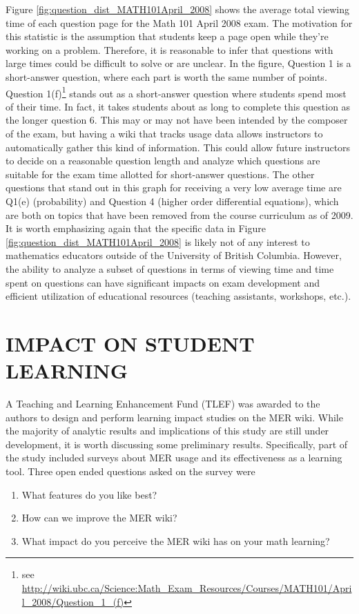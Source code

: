 \documentclass{primus}
\begin{document}
\noindent{}Figure \ref{fig:question_dist_MATH101April_2008} shows the average total viewing time of each question page for the Math 101 April 2008 exam. The motivation for this statistic is the assumption that students keep a page open while they’re working on a problem. Therefore, it is reasonable to infer that questions with large times could be difficult to solve or are unclear. In the figure, Question 1 is a short-answer question, where each part is worth the same number of points. Question 1(f)\footnote{see \url{http://wiki.ubc.ca/Science:Math_Exam_Resources/Courses/MATH101/April_2008/Question_1_(f)}} stands out as a short-answer question where students spend most of their time. In fact, it takes students about as long to complete this question as the longer question 6. This may or may not have been intended by the composer of the exam, but having a wiki that tracks usage data allows instructors to automatically gather this kind of information. This could allow future instructors to decide on a reasonable question length and analyze which questions are suitable for the exam time allotted for short-answer questions. The other questions that stand out in this graph for receiving a very low average time are Q1(e) (probability) and Question 4 (higher order differential equations), which are both on topics that have been removed from the course curriculum as of 2009.  It is worth emphasizing again that the specific data in Figure \ref{fig:question_dist_MATH101April_2008} is likely not of any interest to mathematics educators outside of the University of British Columbia.  However, the ability to analyze a subset of questions in terms of viewing time and time spent on questions can have significant impacts on exam development and efficient utilization of educational resources (teaching assistants, workshops, etc.).

\section{IMPACT ON STUDENT LEARNING}
A Teaching and Learning Enhancement Fund (TLEF) was awarded to the authors to design and perform learning impact studies on the MER wiki.  While the majority of analytic results and implications of this study are still under development, it is worth discussing some preliminary results.  Specifically, part of the study included surveys about MER usage and its effectiveness as a learning tool.  Three open ended questions asked on the survey were

\begin{enumerate}
\item What features do you like best?
\item How can we improve the MER wiki?
\item What impact do you perceive the MER wiki has on your math learning?
\end{enumerate}
\end{document}
